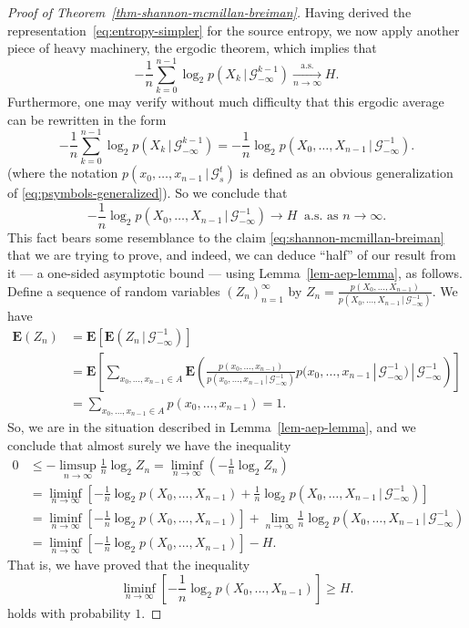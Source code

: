 \documentclass[12pt]{article}
\newcommand{\expec}{\mathbf{E}}
\newcommand{\condexp}[2]{\expec\left(#1\,|\,#2\right)}
\theoremstyle{example}
\begin{document}
\begin{proof}[Proof of Theorem~\ref{thm-shannon-mcmillan-breiman}]
Having derived the representation~\eqref{eq:entropy-simpler} for the source entropy, we now apply another piece of heavy machinery, the ergodic theorem, which implies that
$$ -\frac{1}{n} \sum_{k=0}^{n-1} \log_2 p(X_k\,|\,\mathcal{G}_{-\infty}^{k-1}) \xrightarrow[n\to\infty]{\textrm{a.s.}} H. $$
Furthermore, one may verify without much difficulty that this ergodic average can be rewritten in the form
\begin{equation} \label{eq:aep-ergodic-average1}
 -\frac{1}{n} \sum_{k=0}^{n-1} \log_2 p(X_k\,|\,\mathcal{G}_{-\infty}^{k-1}) = -\frac{1}{n} \log_2 p(X_0,\ldots,X_{n-1}\,|\,\mathcal{G}_{-\infty}^{-1}).
\end{equation}
(where the notation $p(x_0,\ldots,x_{n-1}\,|\,\mathcal{G}_s^t)$ is defined as an obvious generalization of \eqref{eq:psymbols-generalized}). So we conclude that 
$$ -\frac{1}{n} \log_2 p(X_0,\ldots,X_{n-1}\,|\,\mathcal{G}_{-\infty}^{-1})
\to H \ \textrm{ a.s. as }n\to\infty. $$
This fact bears some resemblance to the claim \eqref{eq:shannon-mcmillan-breiman} that we are trying to prove, and indeed, we can deduce ``half'' of our result from it --- a one-sided asymptotic bound --- using Lemma~\ref{lem-aep-lemma}, as follows. Define a sequence of random variables $(Z_n)_{n=1}^\infty$ by $Z_n = \frac{p(X_0,\ldots,X_{n-1})}{p(X_0,\ldots,X_{n-1}\,|\,\mathcal{G}_{-\infty}^{-1})}$. We have
\begin{align}
\expec(Z_n) &= \expec \left[\condexp{Z_n}{\mathcal{G}_{-\infty}^{-1}}\right]
\nonumber \\ &= \expec\left[
\sum_{x_0,\ldots,x_{n-1}\in A} 
\condexp{
\frac{p(x_0,\ldots,x_{n-1})}{p(x_0,\ldots,x_{n-1}\,|\,\mathcal{G}_{-\infty}^{-1})}
p(x_0,\ldots,x_{n-1}\,|\,\mathcal{G}_{-\infty}^{-1})
}{\mathcal{G}_{-\infty}^{-1}}
\right]
\nonumber \\ &= \sum_{x_0,\ldots,x_{n-1}\in A} p(x_0,\ldots,x_{n-1}) = 1.
\label{eq:aep-expec1}
\end{align}
So, we are in the situation described in Lemma~\ref{lem-aep-lemma}, and we conclude that almost surely we have the inequality
\begin{align*}
0 &\le -\limsup_{n\to\infty} \frac{1}{n} \log_2 Z_n = \liminf_{n\to\infty} \left(-\frac{1}{n} \log_2 Z_n\right)
 \\ &= \liminf_{n\to\infty} \left[
-\frac{1}{n} \log_2 p(X_0,\ldots,X_{n-1}) + \frac{1}{n}\log_2 p(X_0,\ldots,X_{n-1}\,|\,\mathcal{G}_{-\infty}^{-1}) \right]
\\ &=
\liminf_{n\to\infty} \left[-\frac{1}{n} \log_2 p(X_0,\ldots,X_{n-1})\right] + 
\lim_{n\to\infty}
\frac{1}{n}\log_2 p(X_0,\ldots,X_{n-1}\,|\,\mathcal{G}_{-\infty}^{-1})
\\ &= 
\liminf_{n\to\infty} \left[-\frac{1}{n} \log_2 p(X_0,\ldots,X_{n-1})\right] - H.
\end{align*}
That is, we have proved that the inequality
\begin{equation} \label{eq:smb-first-half}
\liminf_{n\to\infty} \left[-\frac{1}{n} \log_2 p(X_0,\ldots,X_{n-1})\right] \ge H.
\end{equation}
holds with probability $1$.


\end{proof}
\end{document}
